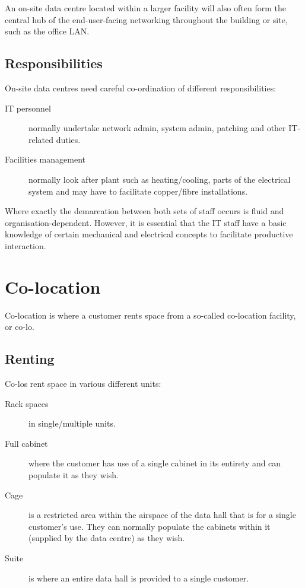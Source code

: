 \documentclass{pgnotes}
\begin{document}
An on-site data centre located within a larger facility will also often form the central hub of the end-user-facing networking throughout the building or site, such as the office LAN.

\subsection{Responsibilities}

On-site data centres need careful co-ordination of different responsibilities:
\begin{description}
\item[IT personnel] normally undertake network admin, system admin, patching and other IT-related duties.
\item[Facilities management] normally look after plant such as heating/cooling, parts of the electrical system and may have to facilitate copper/fibre installations.
\end{description}
Where exactly the demarcation between both sets of staff occurs is fluid and organisation-dependent.
However, it is essential that the IT staff have a basic knowledge of certain mechanical and electrical concepts to facilitate productive interaction. 

\section{Co-location}

Co-location is where a customer rents space from a so-called co-location facility, or co-lo.

\subsection{Renting}

Co-los rent space in various different units:
\begin{description}
\item[Rack spaces] in single/multiple units.
\item[Full cabinet] where the customer has use of a single cabinet in its entirety and can populate it as they wish.
\item[Cage] is a restricted area within the airspace of the data hall that is for a single customer's use.  They can normally populate the cabinets within it (supplied by the data centre) as they wish. 
\item[Suite] is where an entire data hall is provided to a single customer.
\end{description}
\end{document}
